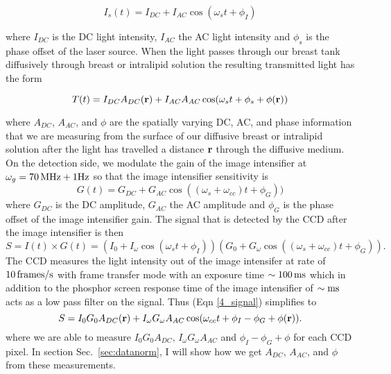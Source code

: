 \begin{equation}
I_s(t) = I_{DC} + I_{AC}\cos(\omega_s t+\phi_I)
\end{equation}

where  $I_{DC}$ is the DC light intensity, $I_{AC}$ the AC light intensity and $\phi_s$ is the phase offset of the laser source. When the light passes through our breast tank diffusively through breast or intralipid solution the resulting transmitted light has the form

\begin{equation}
T(t) = I_{DC}A_{DC}({\bf r}) + I_{AC}A_{AC}\cos(\omega_s t +\phi_s+ \phi({\bf r}))
\end{equation}

where $A_{DC}$, $A_{AC}$, and $\phi$ are the spatially varying DC, AC, and phase information that we are measuring from the surface of our diffusive breast or intralipid solution after the light has travelled a distance $\bf{r}$ through the diffusive medium. On the detection side, we modulate the gain of the image intensifier at $\omega_{g}=70\,{\rm MHz} + 1 {\rm Hz}$ so that the image intensifier sensitivity is
\begin{equation}
G(t) = G_{DC} +G_{AC} \cos((\omega_s+\omega_{cc})t+\phi_G))
\end{equation}
\noindent
where $G_{DC}$ is the DC amplitude, $G_{AC}$ the AC amplitude and $\phi_G$ is the phase offset of the image intensifier gain. The signal that is detected by the CCD after the image intensifier is then
\begin{equation}
S = I(t) \times G(t) = (I_{0} + I_{\omega}\cos(\omega_s t+\phi_I))(G_{0} +G_{\omega}\cos((\omega_s+\omega_{cc})t+\phi_G)).
\label{4_signal}
\end{equation}
The CCD measures the light intensity out of the image intensifer at rate of $10\, {\rm frames/s}$ with frame transfer mode with an exposure time $\sim100\, {\rm ms}$ which in addition to the phosphor screen response time of the image intensifier of $\sim{\rm ms}$ acts as a low pass filter on the signal. Thus (Eqn \ref{4_signal}) simplifies to
\begin{equation}
\label{eqn:heterodyne}
S  = I_{0}G_{0}A_{DC}({\bf r}) + I_{\omega}G_{\omega}A_{AC}\cos(\omega_{cc}t+\phi_I-\phi_G+\phi({\bf r})).
\end{equation}
where we are able to measure $I_{0}G_{0}A_{DC},\,I_{\omega}G_{\omega}A_{AC}$ and $\phi_I-\phi_G+\phi$ for each CCD pixel. In section Sec.~\ref{sec:datanorm}, I will show how we get $A_{DC}$, $A_{AC}$, and $\phi$ from these measurements.




